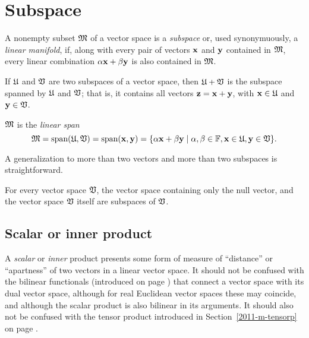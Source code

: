 \section{Subspace}
\label{2011-m-subspace}
A nonempty subset ${\frak M}$ of a vector space is a {\em subspace}
or, used synonymuously,
a {\em linear manifold},
 if, along with every pair of vectors ${\bf x}$   and  ${\bf y}$
 contained in  ${\frak M}$,
 every linear combination
$\alpha {\bf x} + \beta {\bf y}$ is also contained in  ${\frak M}$.

If
${\frak U}$
and
${\frak V}$
are two subspaces of a vector space,
then
${\frak U}+{\frak V}$
is the subspace spanned by
${\frak U}$
and
${\frak V}$;
that is,
it contains all vectors
${\bf z}={\bf x}+{\bf y}$, with
${\bf x}\in {\frak U}$  and
${\bf y}\in {\frak V}$.

${\frak M}$ is the {\em linear span}
\begin{equation}
{\frak M}
= \textrm{span}({\frak U},{\frak V})
= \textrm{span}({\bf x},{\bf y}) =
\{\alpha {\bf x} +\beta {\bf y}\mid \alpha ,\beta \in {\Bbb F}, {\bf x} \in {\frak U},
{\bf y} \in {\frak V}\}.
\end{equation}


A generalization to more than two vectors and more than two subspaces is straightforward.


For every vector space ${\frak V}$, the vector space containing only the null vector,
 and the vector space ${\frak V}$ itself are subspaces of ${\frak V}$.

\subsection{Scalar or inner product}
\label{2011-m-scalarproduct}

A {\em scalar} or {\em inner} product presents some form of measure of ``distance'' or ``apartness''
of two vectors in a linear vector space.
It should not be confused with the bilinear functionals (introduced on page \pageref{2011-m-dvs}) that connect a vector space with its dual vector space,
although for real Euclidean vector spaces these may coincide,
and although the scalar product is also bilinear in its arguments.
It should also not be confused with the tensor product introduced in Section~\ref{2011-m-tensorp} on page \pageref{2011-m-tensorp}.


